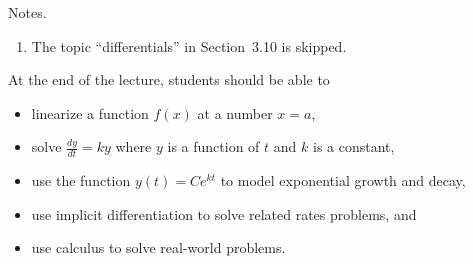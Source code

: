 \documentclass[../main]{subfiles}
\begin{document}
%
%
Notes.
  \begin{enumerate}
    \item The topic ``differentials'' in Section~3.10 is skipped.
  \end{enumerate}




%
%

  At the end of the lecture, students should be able to
  \begin{itemize}
    \item linearize a function \(f(x)\) at a number \(x = a\), 
    \item solve \(\frac{dy}{dt} = ky\) where \(y\) is a function of \(t\) and \(k\) is a constant,
    \item use the function \(y(t) = C e^{kt}\) to model exponential growth and decay,
    \item use implicit differentiation to solve related rates problems, and
    \item use calculus to solve real-world problems.
  \end{itemize}




%
%
%
\end{document}
